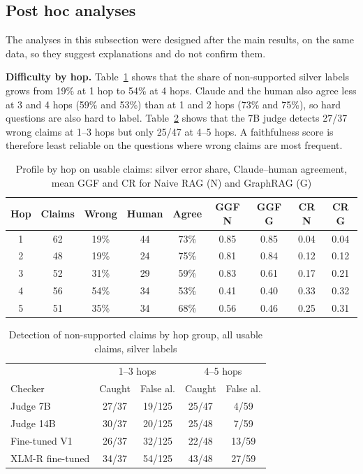 \documentclass[conference]{IEEEtran}
\begin{document}
\subsection{Post hoc analyses}
\label{sec:posthoc}
The analyses in this subsection were designed after the main results, on the same data, so they suggest explanations and do not confirm them.

\textbf{Difficulty by hop.} Table~\ref{tab:hop} shows that the share of non-supported silver labels grows from 19\% at 1 hop to 54\% at 4 hops. Claude and the human also agree less at 3 and 4 hops (59\% and 53\%) than at 1 and 2 hops (73\% and 75\%), so hard questions are also hard to label. Table~\ref{tab:dethop} shows that the 7B judge detects 27/37 wrong claims at 1--3 hops but only 25/47 at 4--5 hops. A faithfulness score is therefore least reliable on the questions where wrong claims are most frequent.

\begin{table}[t]
\caption{Profile by hop on usable claims: silver error share, Claude--human agreement, mean GGF and CR for Naive RAG (N) and GraphRAG (G)}
\label{tab:hop}
\centering
\footnotesize
\setlength{\tabcolsep}{3pt}
\begin{tabular}{ccccccccc}
\toprule
Hop & Claims & Wrong & Human & Agree & GGF N & GGF G & CR N & CR G \\
\midrule
1 & 62 & 19\% & 44 & 73\% & 0.85 & 0.85 & 0.04 & 0.04 \\
2 & 48 & 19\% & 24 & 75\% & 0.81 & 0.84 & 0.12 & 0.12 \\
3 & 52 & 31\% & 29 & 59\% & 0.83 & 0.61 & 0.17 & 0.21 \\
4 & 56 & 54\% & 34 & 53\% & 0.41 & 0.40 & 0.33 & 0.32 \\
5 & 51 & 35\% & 34 & 68\% & 0.56 & 0.46 & 0.25 & 0.31 \\
\bottomrule
\end{tabular}
\end{table}

\begin{table}[t]
\caption{Detection of non-supported claims by hop group, all usable claims, silver labels}
\label{tab:dethop}
\centering
\footnotesize
\begin{tabular}{lcccc}
\toprule
 & \multicolumn{2}{c}{1--3 hops} & \multicolumn{2}{c}{4--5 hops} \\
Checker & Caught & False al. & Caught & False al. \\
\midrule
Judge 7B & 27/37 & 19/125 & 25/47 & 4/59 \\
Judge 14B & 30/37 & 20/125 & 25/48 & 7/59 \\
Fine-tuned V1 & 26/37 & 32/125 & 22/48 & 13/59 \\
XLM-R fine-tuned & 34/37 & 54/125 & 43/48 & 27/59 \\
\bottomrule
\end{tabular}
\end{table}
\end{document}
